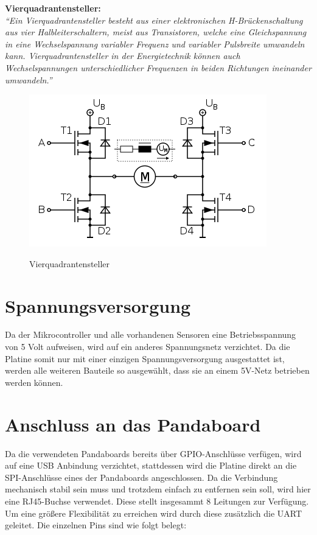 \begin{minipage}{0.9\textwidth}
\textbf{Vierquadrantensteller:\\}
\emph{``Ein Vierquadrantensteller besteht aus einer elektronischen H-Brückenschaltung aus vier Halbleiterschaltern, meist aus Transistoren, 
welche eine Gleichspannung in eine Wechselspannung variabler Frequenz und variabler Pulsbreite umwandeln kann. Vierquadrantensteller 
in der Energietechnik können auch Wechselspannungen unterschiedlicher Frequenzen in beiden Richtungen ineinander umwandeln.''}\cite{vierquadrantensteller2}
\end{minipage}

\begin{figure}[H]
\centering
\includegraphics[width=.8\textwidth]{Vierquadrantensteller.png}\\
\caption{Vierquadrantensteller \cite{vierquadrantensteller}}%
\label{fig:Vierquadrantensteller2}
\end{figure}

\section{Spannungsversorgung}
Da der Mikrocontroller und alle vorhandenen Sensoren eine Betriebs\-spannung von 5 Volt aufweisen, wird auf ein anderes Spannungsnetz verzichtet.
Da die Platine somit nur mit einer einzigen Spannungsversorgung ausgestattet ist, werden alle weiteren Bauteile so ausgewählt, dass sie 
an einem 5V-Netz betrieben werden können.

\section{Anschluss an das Pandaboard}
Da die verwendeten Pandaboards bereits über GPIO-Anschlüsse verfügen, wird auf eine USB Anbindung verzichtet, stattdessen wird die Platine direkt an die SPI-Anschlüsse
eines der Pandaboards angeschlossen. Da die Verbindung mechanisch stabil sein muss und trotzdem einfach zu entfernen sein soll, wird hier eine RJ45-Buchse verwendet.
Diese stellt insgesammt 8 Leitungen zur Verfügung. Um eine größere Flexibilität zu erreichen wird durch diese zusätzlich die UART geleitet.
Die einzelnen Pins sind wie folgt belegt:

